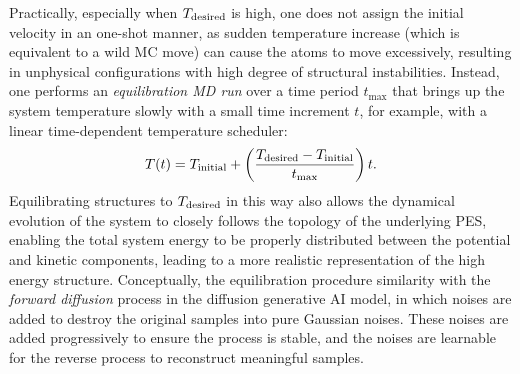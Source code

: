 Practically, especially when $T_{\mbox{\scriptsize{desired}}}$ is high, one does not assign the initial velocity in an one-shot manner, as sudden temperature increase (which is equivalent to a wild MC move) can cause the atoms to move excessively, resulting in unphysical configurations with high degree of structural instabilities. Instead, one performs an \textit{equilibration MD run} over a time period $t_{\max}$ that brings up the system temperature slowly with a small time increment $t$, for example, with a linear time-dependent temperature scheduler:
\begin{equation*}
T(t)=T_{\mbox{\scriptsize{initial}}}+\left(\frac{T_{\mbox{\scriptsize{desired}}}-T_{\mbox{\scriptsize{initial}}}}{t_{\max}}\right)t.
\end{equation*}
Equilibrating structures to $T_{\mbox{\scriptsize{desired}}}$  in this way also allows the dynamical evolution of the system to closely follows the topology of the underlying PES, enabling the total system energy to be properly distributed between the potential and kinetic components, leading to a more realistic representation of the high energy structure. Conceptually, the equilibration procedure similarity with the \emph{forward diffusion} process in the diffusion generative AI model,\cite{ho2020denoising} in which  noises are  added to destroy the original samples into pure Gaussian noises. These noises are added progressively to ensure the process is stable, and the noises are learnable for the reverse process to reconstruct meaningful samples.

